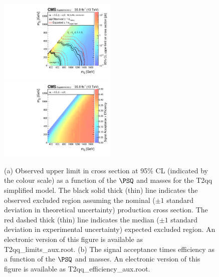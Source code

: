 \begin{figure}
    \begin{center}
            \includegraphics[width=0.50\textwidth]{Supplementary/T2qqXSEC}
            \includegraphics[width=0.50\textwidth]{Supplementary/T2qq_efficiency_aux}
        \caption{ (a) Observed upper limit in cross section at 95\% CL (indicated
        by the colour scale) as a function of 
        the $\PSQ$ and \PSGczDo %
        masses for the 
        T2qq %
        simplified  model.  The  black  solid thick  (thin)  line indicates  the
        observed  excluded  region  assuming   the  nominal  (${\pm}1$  standard
        deviation in theoretical uncertainty)  production cross section. The red
        dashed  thick  (thin)  line  indicates  the  median  (${\pm}1$  standard
        deviation in experimental uncertainty) expected excluded region.
    An electronic version of this figure is available as T2qq\_limits\_aux.root.
        (b) The signal acceptance times efficiency as a function of 
        the $\PSQ$ and \PSGczDo %
        masses.
    An electronic version of this figure is available as T2qq\_efficiency\_aux.root.
        }
        \label{fig:T2qq}
    \end{center}
\end{figure}

